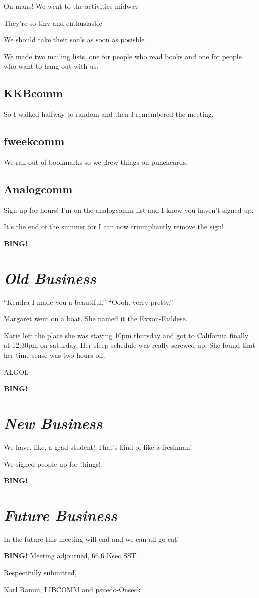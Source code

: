 \documentclass[10pt]{article}
\newcommand{\bing}{{\bf BING!} }
\newcommand{\goto}[1]{\bing \vskip 12pt \section*{{\em{#1}}}}
\begin{document}
On mans!  We went to the activities midway

They're so tiny and enthusiastic

We should take their souls as soon as posisble

We made two mailing lists, one for people who read books and one for
people who want to hang out with us.

\subsection*{KKBcomm}

So I walked halfway to random and then I remembered the meeting.

\subsection*{fweekcomm}

We ran out of bookmarks so we drew things on punchcards.

\subsection*{Analogcomm}

Sign up for hours!  I'm on the analogcomm list and I know you haven't
signed up.

It's the end of the summer for I can now triumphantly remove the sign!

\goto{Old Business}

\BING

``Kendra I made you a beautiful.''  
``Oooh, verry pretty.''

Margaret went on a boat.  She named it the Exxon-Faildese.

Katie left the place she was staying 10pm thursday and got to California finally at
12:30pm on saturday.  Her sleep schedule was really screwed up.  She found
that her time sense was two hours off.

ALGOL

\goto{New Business}

\BING

We have, like, a grad student!  That's kind of like a freshman!

We signed people up for things!

\goto{Future Business}

In the future this meeting will end and we can all go eat!

\bing
\noindent
Meeting adjourned, 66.6 Ksec SST.

\vspace{18pt}

\centerline{Respectfully submitted,}
\centerline{Karl Ramm, LIBCOMM and psuedo-Onseck}
\end{document}
